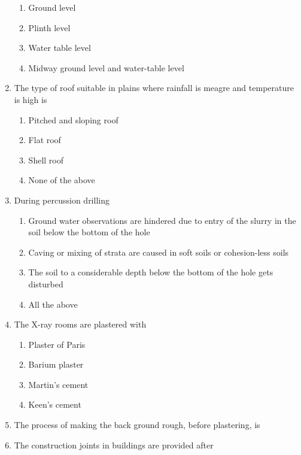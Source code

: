 \documentclass[11pt,a4paper]{article}
\begin{document}
\begin{enumerate}
\begin{enumerate}[label=\Alph*.]
\item{Ground level}
\item{Plinth level}
\item{Water table level}
\item{Midway ground level and water-table level}
\end{enumerate}
\item{The type of roof suitable in plains where rainfall is meagre and temperature is high is}
\begin{enumerate}[label=\Alph*.]
\item{Pitched and sloping roof}
\item{Flat roof}
\item{Shell roof}
\item{None of the above}
\end{enumerate}
\item{During percussion drilling}
\begin{enumerate}[label=\Alph*.]
\item{Ground water observations are hindered due to entry of the slurry in the soil below the bottom of the hole}
\item{Caving or mixing of strata are caused in soft soils or cohesion-less soils}
\item{The soil to a considerable depth below the bottom of the hole gets disturbed}
\item{All the above}
\end{enumerate}
\item{The X-ray rooms are plastered with}
\begin{enumerate}[label=\Alph*.]
\item{Plaster of Paris}
\item{Barium plaster}
\item{Martin's cement}
\item{Keen's cement}
\end{enumerate}
\item{The process of making the back ground rough, before plastering, is}
\\
\item{The construction joints in buildings are provided after}

\end{enumerate}
\end{document}
